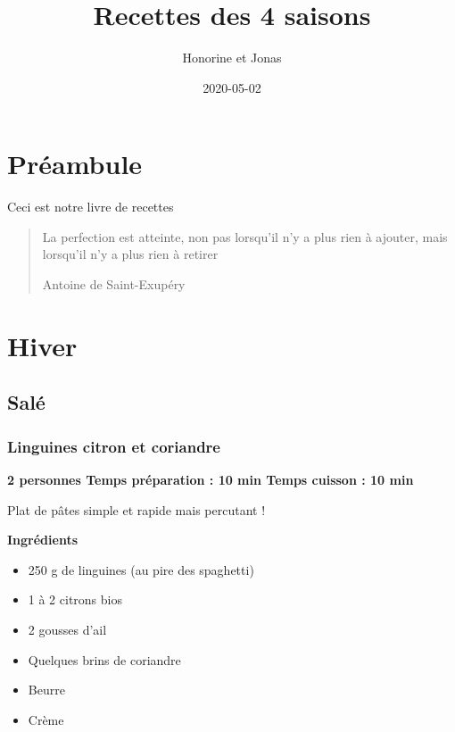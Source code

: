 \documentclass[]{book}
\title{Recettes des 4 saisons}
\author{Honorine et Jonas}
\date{2020-05-02}
\providecommand{\tightlist}{%
  \setlength{\itemsep}{0pt}\setlength{\parskip}{0pt}}
\begin{document}
\maketitle

{
\setcounter{tocdepth}{1}
\tableofcontents
}
\hypertarget{Pruxe9ambule}{%
\chapter*{Préambule}\label{Pruxe9ambule}}

Ceci est notre livre de recettes

\begin{quote}
La perfection est atteinte, non pas lorsqu'il n'y a plus rien à ajouter, mais lorsqu'il n'y a plus rien à retirer

Antoine de Saint-Exupéry
\end{quote}

\hypertarget{hiver}{%
\chapter*{Hiver}\label{hiver}}

\hypertarget{saluxe9}{%
\section*{Salé}\label{saluxe9}}

\hypertarget{linguines-citron-et-coriandre}{%
\subsection*{\texorpdfstring{{Linguines citron et coriandre}}{Linguines citron et coriandre}}\label{linguines-citron-et-coriandre}}

\begin{salebox}
\textbf{2 personnes \textbar{} Temps préparation : 10 min \textbar{}
Temps cuisson : 10 min}

Plat de pâtes simple et rapide mais percutant !
\end{salebox}

\textbf{Ingrédients}

\begin{itemize}
\tightlist
\item
  250 g de linguines (au pire des spaghetti)
\item
  1 à 2 citrons bios
\item
  2 gousses d'ail
\item
  Quelques brins de coriandre
\item
  Beurre
\item
  Crème
\end{itemize}
\end{document}
